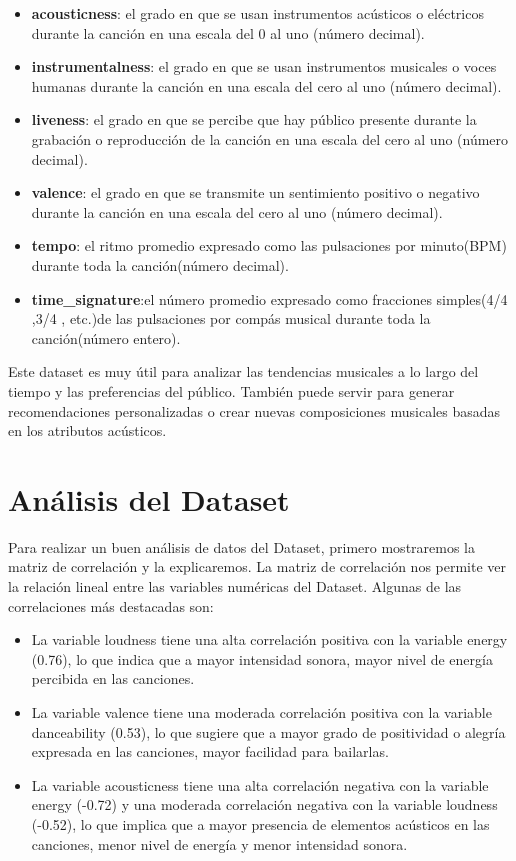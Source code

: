 \documentclass{wsdcr}
\begin{document}
\begin{itemize}
    \item \textbf{acousticness}: el grado en que se usan instrumentos acústicos o eléctricos durante la canción en una escala del 0 al uno (número decimal).
    \item \textbf{instrumentalness}: el grado en que se usan instrumentos musicales o voces humanas durante la canción en una escala del cero al uno (número decimal).
    \item \textbf{liveness}: el grado en que se percibe que hay público presente durante la grabación o reproducción de la canción en una escala del cero al uno (número decimal).
    \item \textbf{valence}: el grado en que se transmite un sentimiento positivo o negativo durante la canción en una escala del cero al uno (número decimal).
    \item \textbf{tempo}: el ritmo promedio expresado como las pulsaciones por minuto(BPM) durante toda la canción(número decimal).
    \item \textbf{time\_signature}:el número promedio expresado como fracciones simples(4/4 ,3/4 , etc.)de las pulsaciones por compás musical durante toda la canción(número entero).
\end{itemize}

Este dataset es muy útil para analizar las tendencias musicales a lo largo del tiempo y las preferencias del público. También puede servir para generar recomendaciones personalizadas o crear nuevas composiciones musicales basadas en los atributos acústicos.

\section{Análisis del Dataset}

Para realizar un buen análisis de datos del Dataset, primero mostraremos la matriz de correlación y la explicaremos. La matriz de correlación nos permite ver la relación lineal entre las variables numéricas del Dataset. Algunas de las correlaciones más destacadas son:

\begin{itemize}
    \item La variable loudness tiene una alta correlación positiva con la variable energy (0.76), lo que indica que a mayor intensidad sonora, mayor nivel de energía percibida en las canciones.
    \item La variable valence tiene una moderada correlación positiva con la variable danceability (0.53), lo que sugiere que a mayor grado de positividad o alegría expresada en las canciones, mayor facilidad para bailarlas.
    \item La variable acousticness tiene una alta correlación negativa con la variable energy (-0.72) y una moderada correlación negativa con la variable loudness (-0.52), lo que implica que a mayor presencia de elementos acústicos en las canciones, menor nivel de energía y menor intensidad sonora.
\end{itemize}
\end{document}
